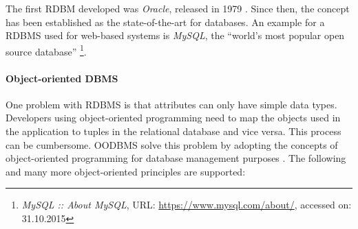 The first RDBM developed was \emph{Oracle}, released in 1979 \cite{oracleDB}. Since then, the concept has been established as the state-of-the-art for databases. An example for a RDBMS used for web-based systems is \emph{MySQL}, the ``world's most popular open source database''
\footnote{
  \emph{MySQL :: About MySQL},
  URL: \url{https://www.mysql.com/about/},
  accessed on: 31.10.2015
}.


\paragraph{Object-oriented DBMS} %
\label{par:object_oriented_dbms}

One problem with RDBMS is that attributes can only have simple data types. Developers using object-oriented programming need to map the objects used in the application to tuples in the relational database and vice versa. This process can be cumbersome. OODBMS solve this problem by adopting the concepts of object-oriented programming for database management purposes
\cite{oodbms}.
The following and many more object-oriented principles are supported:

